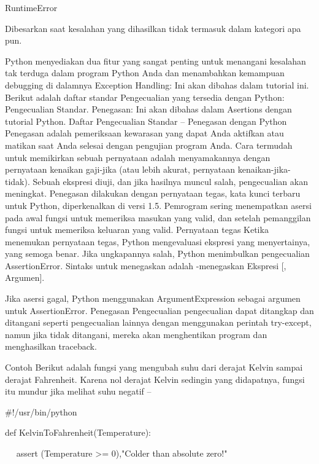RuntimeError \hspace*{0.5in}  

Dibesarkan saat kesalahan yang dihasilkan tidak termasuk dalam kategori apa pun. 
\vspace{12pt}

 \hspace*{0.64in} Python menyediakan dua fitur yang sangat penting untuk menangani kesalahan tak terduga dalam program Python Anda dan menambahkan kemampuan debugging di dalamnya Exception Handling: Ini akan dibahas dalam tutorial ini. Berikut adalah daftar standar Pengecualian yang tersedia dengan Python: Pengecualian Standar. Penegasan: Ini akan dibahas dalam Asertions dengan tutorial Python. Daftar Pengecualian Standar – Penegasan dengan Python Penegasan adalah pemeriksaan kewarasan yang dapat Anda aktifkan atau matikan saat Anda selesai dengan pengujian program Anda. Cara termudah untuk memikirkan sebuah pernyataan adalah menyamakannya dengan pernyataan kenaikan gaji-jika (atau lebih akurat, pernyataan kenaikan-jika-tidak). Sebuah ekspresi diuji, dan jika hasilnya muncul salah, pengecualian akan meningkat. Penegasan dilakukan dengan pernyataan tegas, kata kunci terbaru untuk Python, diperkenalkan di versi 1.5. Pemrogram sering menempatkan asersi pada awal fungsi untuk memeriksa masukan yang valid, dan setelah pemanggilan fungsi untuk memeriksa keluaran yang valid. Pernyataan tegas Ketika menemukan pernyataan tegas, Python mengevaluasi ekspresi yang menyertainya, yang semoga benar. Jika ungkapannya salah, Python menimbulkan pengecualian AssertionError. Sintaks untuk menegaskan adalah -menegaskan Ekspresi [, Argumen]. 

 \hspace*{0.5in} Jika asersi gagal, Python menggunakan ArgumentExpression sebagai argumen untuk AssertionError. Penegasan Pengecualian pengecualian dapat ditangkap dan ditangani seperti pengecualian lainnya dengan menggunakan perintah try-except, namun jika tidak ditangani, mereka akan menghentikan program dan menghasilkan traceback. 
 
Contoh Berikut adalah fungsi yang mengubah suhu dari derajat Kelvin sampai derajat Fahrenheit. Karena nol derajat Kelvin sedingin yang didapatnya, fungsi itu mundur jika melihat suhu negatif –
\vspace{12pt}

 $  \#  $!/usr/bin/python 
 
def KelvinToFahrenheit(Temperature): 

~~ assert (Temperature >= 0),"Colder than absolute zero!" 

